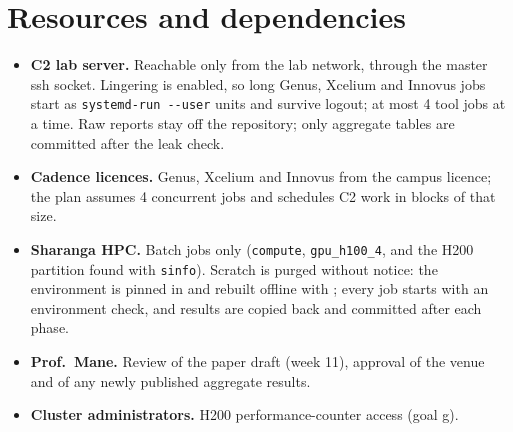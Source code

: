 \documentclass[11pt,a4paper]{article}
\begin{document}
\section{Resources and dependencies}
\begin{itemize}
\item \textbf{C2 lab server.} Reachable only from the lab network, through the master ssh socket. Lingering is
enabled, so long Genus, Xcelium and Innovus jobs start as \texttt{systemd-run -{}-user} units and survive logout; at most
4 tool jobs at a time. Raw reports stay off the repository; only aggregate tables are committed after the leak check.
\item \textbf{Cadence licences.} Genus, Xcelium and Innovus from the campus licence; the plan assumes 4
concurrent jobs and schedules C2 work in blocks of that size.
\item \textbf{Sharanga HPC.} Batch jobs only (\texttt{compute}, \texttt{gpu\_h100\_4}, and the H200 partition found
with \texttt{sinfo}). Scratch is purged without notice: the environment is pinned in
 and rebuilt offline with ; every
job starts with an environment check, and results are copied back and committed after each phase.
\item \textbf{Prof.\ Mane.} Review of the paper draft (week 11), approval of the venue and of any newly published
aggregate results.
\item \textbf{Cluster administrators.} H200 performance-counter access (goal g).
\end{itemize}
\end{document}
